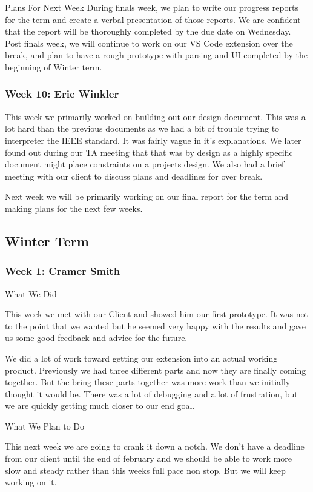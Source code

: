 Plans For Next Week
During finals week, we plan to write our progress reports for the term and create a verbal presentation of those reports. We are confident that the report will be thoroughly completed by the due date on Wednesday. Post finals week, we will continue to work on our VS Code extension over the break, and plan to have a rough prototype with parsing and UI completed by the beginning of Winter term.

\subsubsection{Week 10: Eric Winkler}

This week we primarily worked on building out our design document. This was a lot hard than the previous documents as we had a bit of trouble trying to interpreter the IEEE standard. It was fairly vague in it's explanations. We later found out during our TA meeting that that was by design as a highly specific document might place constraints on a projects design. We also had a brief meeting with our client to discuss plans and deadlines for over break.

Next week we will be primarily working on our final report for the term and making plans for the next few weeks.

\subsection{Winter Term}
\subsubsection{Week 1: Cramer Smith}

What We Did

This week we met with our Client and showed him our first prototype. It was not to the point that we wanted but he seemed very happy with the results and gave us some good feedback and advice for the future. 

We did a lot of work toward getting our extension into an actual working product. Previously we had three different parts and now they are finally coming together. But the bring these parts together was more work than we initially thought it would be. There was a lot of debugging and a lot of frustration, but we are quickly getting much closer to our end goal.

What We Plan to Do

This next week we are going to crank it down a notch. We don't have a deadline from our client until the end of february and we should be able to work more slow and steady rather than this weeks full pace non stop. But we will keep working on it.


